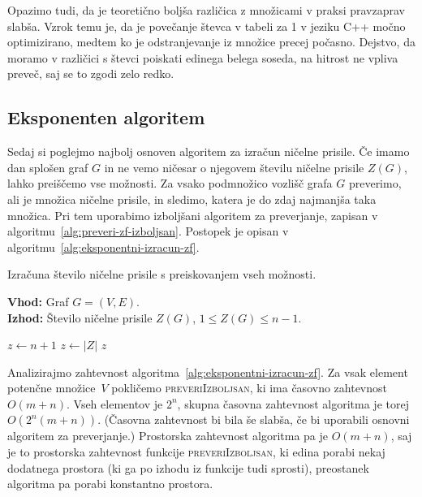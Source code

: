 \documentclass[12pt,a4paper,twoside]{article}
\theoremstyle{definition} %
\theoremstyle{plain} %
\numberwithin{equation}{section}  %
\begin{document}
Opazimo tudi, da je teoretično boljša različica z množicami v praksi pravzaprav slabša. Vzrok temu je, da je povečanje števca v tabeli za 1 v jeziku C++ močno optimizirano, medtem ko je odstranjevanje iz množice precej počasno. Dejstvo, da moramo v različici s števci poiskati edinega belega soseda, na hitrost ne vpliva preveč, saj se to zgodi zelo redko. 

\subsection{Eksponenten algoritem}
Sedaj si poglejmo najbolj osnoven algoritem za izračun ničelne prisile. Če imamo dan splošen graf $G$ in ne vemo ničesar o njegovem številu ničelne prisile $Z(G)$, lahko preiščemo vse možnosti. Za vsako podmnožico vozlišč grafa $G$ preverimo, ali je množica ničelne prisile, in sledimo, katera je do zdaj najmanjša taka množica. Pri tem uporabimo izboljšani algoritem za preverjanje, zapisan v algoritmu~\ref{alg:preveri-zf-izboljsan}. Postopek je opisan v algoritmu~\ref{alg:eksponentni-izracun-zf}.
\begin{algorithm}[!h]
    \caption{Izračuna število ničelne prisile s preiskovanjem vseh možnosti.}
    \label{alg:eksponentni-izracun-zf}
    \raggedright
    \textbf{Vhod:} Graf $G = (V,E)$. \\
    \textbf{Izhod:} Število ničelne prisile $Z(G)$, $1 \leq Z(G) \leq n-1$.
    \begin{algorithmic}[1]
        \State $z \gets n+1$
         
        \State $z \gets |Z|$
        \EndIf
        \EndFor
        \State \Return $z$
        \EndFunction
    \end{algorithmic}
\end{algorithm}

Analizirajmo zahtevnost algoritma~\ref{alg:eksponentni-izracun-zf}. Za vsak element potenčne množice~$V$ pokličemo \textsc{preveriIzboljsan}, ki ima časovno zahtevnost $O(m+n)$. Vseh elementov je $2^n$, skupna časovna zahtevnost algoritma je torej $O(2^n(m+n))$. (Časovna zahtevnost bi bila še slabša, če bi uporabili osnovni algoritem za preverjanje.)
Prostorska zahtevnost algoritma pa je $O(m+n)$, saj je to prostorska zahtevnost funkcije  \textsc{preveriIzboljsan}, ki edina porabi nekaj dodatnega prostora (ki ga po izhodu iz funkcije tudi sprosti), preostanek algoritma pa porabi konstantno prostora.
\end{document}
